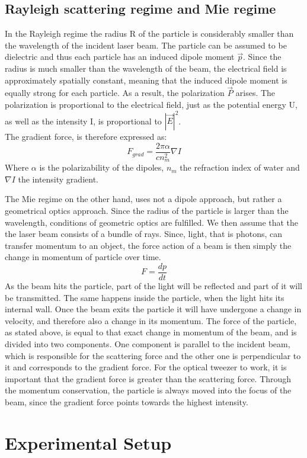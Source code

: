 \documentclass{article}
\begin{document}
\subsection{Rayleigh scattering regime and Mie regime}
In the Rayleigh regime the radius R of the particle is considerably smaller than the wavelength of the incident laser beam. The particle can be assumed to be dielectric and thus each particle has an induced dipole moment $\Vec{p}$. Since the radius is much smaller than the wavelength of the beam, the electrical field is approximately spatially constant, meaning that the induced dipole moment is equally strong for each particle. As a result, the polarization $\Vec{P}$ arises. The polarization is proportional to the electrical field, just as the potential energy U, as well as the intensity I, is proportional to $|\Vec{E}|^2$.\\
The gradient force, is therefore expressed as:
\[ F_{grad} = \frac{2\pi \alpha}{cn_m^2} \nabla I\] Where $\alpha$ is the polarizability of the dipoles, $n_m$ the refraction index of water and $\nabla I$ the intensity gradient.\vspace{0.5cm} 

The Mie regime on the other hand, uses not a dipole approach, but rather a geometrical optics approach. Since the radius of the particle is larger than the wavelength, conditions of geometric optics are fulfilled. We then assume that the the laser beam consists of a bundle of rays. Since, light, that is photons, can transfer momentum to an object, the force action of a beam is then simply the change in momentum of particle over time.
\[ F = \frac{dp}{dt} \]
As the beam hits the particle, part of the light will be reflected and part of it will be transmitted. The same happens inside the particle, when the light hits its internal wall. Once the beam exits the particle it will have undergone a change in velocity, and therefore also a change in its momentum. The force of the particle, as stated above, is equal to that exact change in momentum of the beam, and is divided into two components. One component is parallel to the incident beam, which is responsible for the scattering force and the other one is perpendicular to it and corresponds to the gradient force. For the optical tweezer to work, it is important that the gradient force is greater than the scattering force.
Through the momentum conservation, the particle is always moved into the focus of the beam, since the gradient force points towards the highest intensity.

\section{Experimental Setup}
\end{document}
